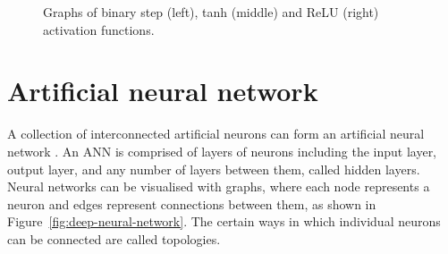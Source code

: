 \begin{figure}[!ht]
\centering
{}
%
%
\caption{Graphs of binary step (left), tanh (middle) and ReLU (right) activation functions.}
\label{fig:activation-functions}
\end{figure}




\section{Artificial neural network}
\label{artificial-neural-network}
A collection of interconnected artificial neurons can form an artificial neural network
\cite[p. 6]{Suzuki_11}.
An ANN is comprised of layers of neurons including the input layer, output layer,
and any number of layers between them, called hidden layers.
Neural networks can be visualised with graphs,
where each node represents a neuron and edges represent connections between them,
as shown in Figure~\ref{fig:deep-neural-network}.
The certain ways in which individual neurons
can be connected are called topologies.

